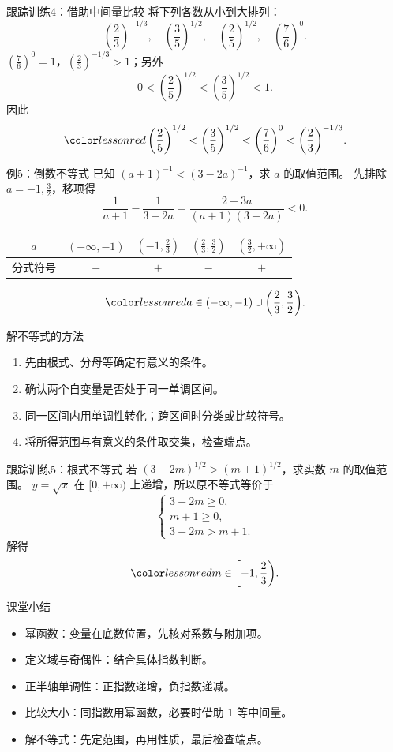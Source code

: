 \documentclass[aspectratio=169,10pt]{beamer}
\begin{document}
\begin{frame}[t]{跟踪训练4：借助中间量比较}
 将下列各数从小到大排列：
 \[\left(\frac23\right)^{-1/3},\quad
   \left(\frac35\right)^{1/2},\quad
   \left(\frac25\right)^{1/2},\quad
   \left(\frac76\right)^0.\]
 \pause
 $\left(\frac76\right)^0=1$，$\left(\frac23\right)^{-1/3}>1$；另外
 \[0<\left(\frac25\right)^{1/2}<\left(\frac35\right)^{1/2}<1.\]
 因此
 \[\ans{\left(\frac25\right)^{1/2}<\left(\frac35\right)^{1/2}
 <\left(\frac76\right)^0<\left(\frac23\right)^{-1/3}}.\]
\end{frame}

\begin{frame}[t]{例5：倒数不等式}
 已知 $(a+1)^{-1}<(3-2a)^{-1}$，求 $a$ 的取值范围。
 \pause
 先排除 $a=-1,\frac32$，移项得
 \[\frac1{a+1}-\frac1{3-2a}
   =\frac{2-3a}{(a+1)(3-2a)}<0.\]
 \renewcommand{\arraystretch}{1.4}\centering\normalsize
 \begin{tabular}{c|cccc}
  $a$ & $(-\infty,-1)$ & $(-1,\frac23)$ & $(\frac23,\frac32)$ & $(\frac32,+\infty)$\\\hline
  分式符号 & $-$ & $+$ & $-$ & $+$
 \end{tabular}
 \[\ans{a\in(-\infty,-1)\cup\left(\frac23,\frac32\right)}.\]
\end{frame}

\begin{frame}[t]{解不等式的方法}
 \begin{enumerate}
  \item 先由根式、分母等确定有意义的条件。
  \item 确认两个自变量是否处于同一单调区间。
  \item 同一区间内用单调性转化；跨区间时分类或比较符号。
  \item 将所得范围与有意义的条件取交集，检查端点。
 \end{enumerate}
 \gap
\end{frame}

\begin{frame}[t]{跟踪训练5：根式不等式}
 若 $(3-2m)^{1/2}>(m+1)^{1/2}$，求实数 $m$ 的取值范围。
 \pause
 $y=\sqrt x$ 在 $[0,+\infty)$ 上递增，所以原不等式等价于
 \[\begin{cases}3-2m\ge0,\\m+1\ge0,\\3-2m>m+1.\end{cases}\]
 解得
 \[\ans{m\in\left[-1,\frac23\right)}.\]
\end{frame}

\begin{frame}[t]{课堂小结}
 \begin{itemize}
  \item 幂函数：变量在底数位置，先核对系数与附加项。
  \item 定义域与奇偶性：结合具体指数判断。
  \item 正半轴单调性：正指数递增，负指数递减。
  \item 比较大小：同指数用幂函数，必要时借助 $1$ 等中间量。
  \item 解不等式：先定范围，再用性质，最后检查端点。
 \end{itemize}
\end{frame}
\campusclosing[谢谢]
\end{document}
